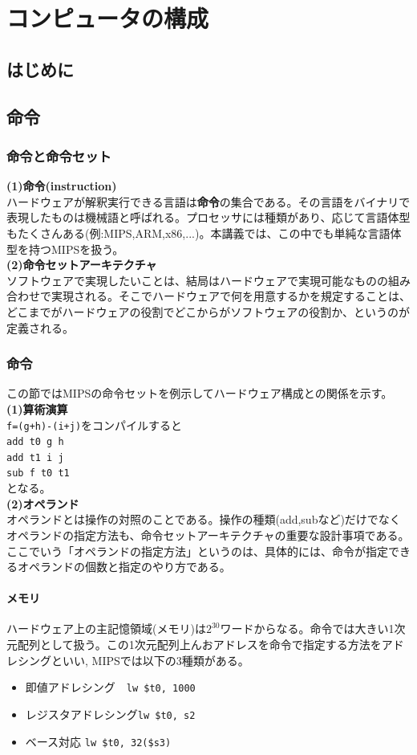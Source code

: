 \documentclass[a4j,10pt,oneside,openany,fleqn]{jsbook}
\begin{document}
\chapter{コンピュータの構成}

\section{はじめに}

\section{命令}
\subsection{命令と命令セット}
\textbf{(1)命令(instruction)}\\
ハードウェアが解釈実行できる言語は\textbf{命令}の集合である。その言語をバイナリで表現したものは機械語と呼ばれる。プロセッサには種類があり、応じて言語体型もたくさんある(例:MIPS,ARM,x86,...)。本講義では、この中でも単純な言語体型を持つMIPSを扱う。\\
\textbf{(2)命令セットアーキテクチャ}\\
ソフトウェアで実現したいことは、結局はハードウェアで実現可能なものの組み合わせで実現される。そこでハードウェアで何を用意するかを規定することは、どこまでがハードウェアの役割でどこからがソフトウェアの役割か、というのが定義される。

\subsection{命令}
この節ではMIPSの命令セットを例示してハードウェア構成との関係を示す。\\
\textbf{(1)算術演算}\\
\texttt{f=(g+h)-(i+j)}をコンパイルすると\\
\texttt{add t0 g h}\\
\texttt{add t1 i j}\\
\texttt{sub f t0 t1}\\
となる。\\
\textbf{(2)オペランド}\\
オペランドとは操作の対照のことである。操作の種類(add,subなど)だけでなくオペランドの指定方法も、命令セットアーキテクチャの重要な設計事項である。ここでいう「オペランドの指定方法」というのは、具体的には、命令が指定できるオペランドの個数と指定のやり方である。\\
\subsubsection{メモリ}
ハードウェア上の主記憶領域(メモリ)は$2^30$ワードからなる。命令では大きい1次元配列として扱う。この1次元配列上んおアドレスを命令で指定する方法をアドレシングといい,
MIPSでは以下の3種類がある。
\begin{itemize}
\item 即値アドレシング　\texttt{lw \$t0, 1000}
\item レジスタアドレシング\texttt{lw \$t0, s2}
\item ベース対応 \texttt{lw \$t0, 32(\$s3)}
\end{itemize}
\end{document}
